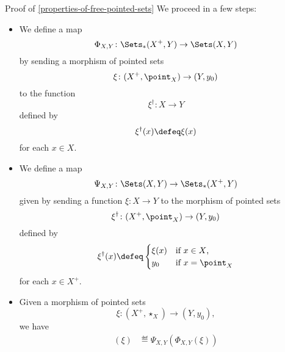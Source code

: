 \begin{Proof}{Proof of \cref{properties-of-free-pointed-sets}}
    We proceed in a few steps:
    \begin{itemize}
        \item\label{proof-of-properties-of-free-pointed-sets-adjointness-1}We define a map
            \[
                \Phi_{X,Y}%
                \colon%
                \Sets_{*}(X^{+},Y)%
                \to%
                \Sets(X,Y)%
            \]%
            by sending a morphism of pointed sets
            \[
                \xi%
                \colon%
                (X^{+},\point_{X})%
                \to%
                (Y,y_{0})%
            \]%
            to the function%
            \[
                \xi^{\dagger}%
                \colon%
                X%
                \to%
                Y%
            \]%
            defined by
            \[
                \xi^{\dagger}(x)%
                \defeq
                \xi(x)%
            \]%
            for each $x\in X$.
        \item\label{proof-of-properties-of-free-pointed-sets-adjointness-2}We define a map
            \[
                \Psi_{X,Y}%
                \colon%
                \Sets(X,Y)%
                \to%
                \Sets_{*}(X^{+},Y)%
            \]%
            given by sending a function $\xi\colon X\to Y$ to the morphism of pointed sets
            \[
                \xi^{\dagger}%
                \colon%
                (X^{+},\point_{X})%
                \to%
                (Y,y_{0})%
            \]%
            defined by
            \[
                \xi^{\dagger}(x)%
                \defeq%
                \begin{cases}
                    \xi(x) & \text{if $x\in X$,}\\
                    y_{0}  & \text{if $x=\point_{X}$}
                \end{cases}
            \]%
            for each $x\in X^{+}$.
        \item\label{proof-of-properties-of-free-pointed-sets-adjointness-3}Given a morphism of pointed sets
            \[
                \xi%
                \colon%
                (X^{+},\star_{X})%
                \to%
                (Y,y_{0}),%
            \]%
            we have
            \begin{align*}
                [\Psi_{X,Y}\circ\Phi_{X,Y}](\xi) &\eqdef \Psi_{X,Y}(\Phi_{X,Y}(\xi))\\%

\end{align*}
\end{itemize}
\end{Proof}
